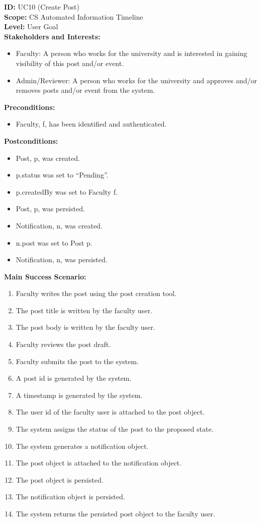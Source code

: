 \textbf{ID:} UC10 (Create Post) \\
\textbf{Scope:} CS Automated Information Timeline \\
\textbf{Level:} User Goal \\
\textbf{Stakeholders and Interests:}
\begin{itemize}
    \item Faculty: A person who works for the university and is interested in gaining visibility of this post and/or event.
    \item Admin/Reviewer: A person who works for the university and approves and/or removes posts and/or event from the system.
\end{itemize}
\textbf{Preconditions:}
\begin{itemize}
    \item Faculty, f, has been identified and authenticated.
\end{itemize}
\textbf{Postconditions:}
\begin{itemize}
    \item Post, p, was created.
    \item p.status was set to “Pending”.
    \item p.createdBy was set to Faculty f.
    \item Post, p, was persisted.
    \item Notification, n, was created.
    \item n.post was set to Post p.
    \item Notification, n, was persisted.
\end{itemize}
\textbf{Main Success Scenario:}
\begin{enumerate}
    \item Faculty writes the post using the post creation tool.
    \item The post title is written by the faculty user.
    \item The post body is written by the faculty user.
    \item Faculty reviews the post draft.
    \item Faculty submits the post to the system.
    \item A post id is generated by the system.
    \item A timestamp is generated by the system.
    \item The user id of the faculty user is attached to the post object.
    \item The system assigns the status of the post to the proposed state.
    \item The system generates a notification object.
    \item The post object is attached to the notification object.
    \item The post object is persisted.
    \item The notification object is persisted.
    \item The system returns the persisted post object to the faculty user.
\end{enumerate}

